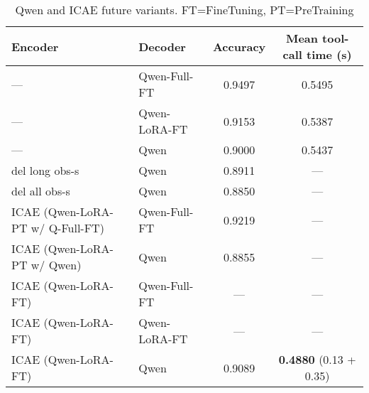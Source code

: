 \documentclass{article}
\begin{document}
\begin{table}[h]
    \centering
    \setlength{\tabcolsep}{6pt}
    \begin{tabular}{llcc}
        \toprule
        \textbf{Encoder} & \textbf{Decoder} & \textbf{Accuracy} & \textbf{Mean tool-call time (s)} \\
        \midrule
        —                           & Qwen-Full-FT   & 0.9497 & 0.5495 \\
        —                           & Qwen-LoRA-FT   & 0.9153 & 0.5387 \\
        —                           & Qwen           & 0.9000 & 0.5437 \\
        \addlinespace
        del long obs-s              & Qwen           & 0.8911 & — \\
        del all obs-s               & Qwen           & 0.8850 & — \\
        \addlinespace
        ICAE (Qwen-LoRA-PT w/ Q-Full-FT)      & Qwen-Full-FT   &  0.9219    &  — \\
        ICAE (Qwen-LoRA-PT w/ Qwen)      & Qwen           & 0.8855 & — \\
        \addlinespace
        ICAE (Qwen-LoRA-FT)         & Qwen-Full-FT   & —    & —  \\
        ICAE (Qwen-LoRA-FT)         & Qwen-LoRA-FT   & —    & — \\
        ICAE (Qwen-LoRA-FT)         & Qwen           & 0.9089 & \textbf{0.4880} (0.13 + 0.35) \\        

        
        \bottomrule
    \end{tabular}
    \caption{Qwen and ICAE future variants. FT=FineTuning, PT=PreTraining}
    \label{tab:qwen_icae_variants}
\end{table}
\end{document}
